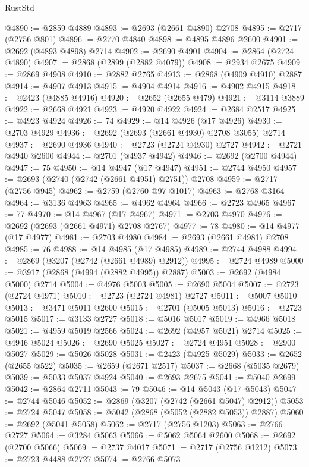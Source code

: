 \begin{lexlean}{RustStd}
\begin{coremodule}
@4890 := @2859 @4889
@4893 := @2693 (@2661 @4890) @2708
@4895 := @2717 (@2756 @801)
@4896 := @2770 @4840
@4898 := @4895 @4896 @2600
@4901 := @2692 (@4893 @4898) @2714
@4902 := @2690 @4901
@4904 := @2864 (@2724 @4890)
@4907 := @2868 (@2899 (@2882 @4079))
@4908 := @2934 @2675
@4909 := @2869 @4908
@4910 := @2882 @2765
@4913 := @2868 (@4909 @4910) @2887
@4914 := @4907 @4913
@4915 := @4904 @4914
@4916 := @4902 @4915
@4918 := @2423 (@4885 @4916)
@4920 := @2652 (@2655 @479)
@4921 := @3114 @3889
@4922 := @2668 @4921
@4923 := @4920 @4922
@4924 := @2684 @2517
@4925 := @4923 @4924
@4926 := 74
@4929 := @14 @4926 (@17 @4926)
@4930 := @2703 @4929
@4936 := @2692 (@2693 (@2661 @4930) @2708 @3055) @2714
@4937 := @2690 @4936
@4940 := @2723 (@2724 @4930) @2727
@4942 := @2721 @4940 @2600
@4944 := @2701 (@4937 @4942)
@4946 := @2692 (@2700 @4944)
@4947 := 75
@4950 := @14 @4947 (@17 @4947)
@4951 := @2744 @4950
@4957 := @2693 (@2740 (@2742 (@2661 @4951) @2751)) @2708
@4959 := @2717 (@2756 @945)
@4962 := @2759 (@2760 @97 @1017)
@4963 := @2768 @3164
@4964 := @3136 @4963
@4965 := @4962 @4964
@4966 := @2723 @4965
@4967 := 77
@4970 := @14 @4967 (@17 @4967)
@4971 := @2703 @4970
@4976 := @2692 (@2693 (@2661 @4971) @2708 @2767)
@4977 := 78
@4980 := @14 @4977 (@17 @4977)
@4981 := @2703 @4980
@4984 := @2693 (@2661 @4981) @2708
@4985 := 76
@4988 := @14 @4985 (@17 @4985)
@4989 := @2744 @4988
@4994 := @2869 (@3207 (@2742 (@2661 @4989) @2912))
@4995 := @2724 @4989
@5000 := @3917 (@2868 (@4994 (@2882 @4995)) @2887)
@5003 := @2692 (@4984 @5000) @2714
@5004 := @4976 @5003
@5005 := @2690 @5004
@5007 := @2723 (@2724 @4971)
@5010 := @2723 (@2724 @4981) @2727
@5011 := @5007 @5010
@5013 := @3471 @5011 @2600
@5015 := @2701 (@5005 @5013)
@5016 := @2723 @5015
@5017 := @3133 @2727
@5018 := @5016 @5017
@5019 := @4966 @5018
@5021 := @4959 @5019 @2566
@5024 := @2692 (@4957 @5021) @2714
@5025 := @4946 @5024
@5026 := @2690 @5025
@5027 := @2724 @4951
@5028 := @2900 @5027
@5029 := @5026 @5028
@5031 := @2423 (@4925 @5029)
@5033 := @2652 (@2655 @522)
@5035 := @2659 (@2671 @2517)
@5037 := @2668 (@5035 @2679)
@5039 := @5033 @5037 @4924
@5040 := @2693 @2675
@5041 := @5040 @2699
@5042 := @2864 @2711
@5043 := 79
@5046 := @14 @5043 (@17 @5043)
@5047 := @2744 @5046
@5052 := @2869 (@3207 (@2742 (@2661 @5047) @2912))
@5053 := @2724 @5047
@5058 := @5042 (@2868 (@5052 (@2882 @5053)) @2887)
@5060 := @2692 (@5041 @5058)
@5062 := @2717 (@2756 @1203)
@5063 := @2766 @2727
@5064 := @3284 @5063
@5066 := @5062 @5064 @2600
@5068 := @2692 (@2700 @5066)
@5069 := @2737 @4017
@5071 := @2717 (@2756 @1212)
@5073 := @2723 @4488 @2727
@5074 := @2766 @5073

\end{coremodule}
\end{lexlean}
